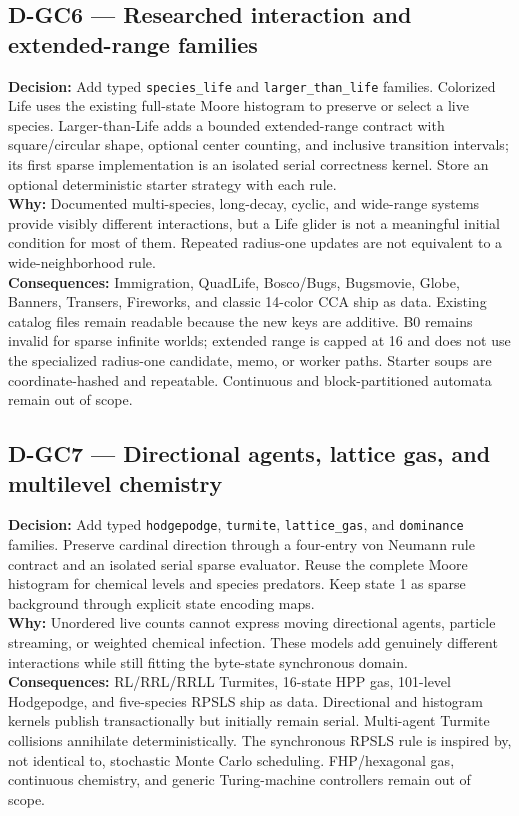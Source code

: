 \subsection*{D-GC6 --- Researched interaction and extended-range families}
\begin{decisionbox}[title={D-GC6 \quad 2026-09-15}]
\textbf{Decision:} Add typed \texttt{species\_life} and
\texttt{larger\_than\_life} families. Colorized Life uses the existing
full-state Moore histogram to preserve or select a live species.
Larger-than-Life adds a bounded extended-range contract with square/circular
shape, optional center counting, and inclusive transition intervals; its first
sparse implementation is an isolated serial correctness kernel. Store an
optional deterministic starter strategy with each rule.\\
\textbf{Why:} Documented multi-species, long-decay, cyclic, and wide-range
systems provide visibly different interactions, but a Life glider is not a
meaningful initial condition for most of them. Repeated radius-one updates are
not equivalent to a wide-neighborhood rule.\\
\textbf{Consequences:} Immigration, QuadLife, Bosco/Bugs, Bugsmovie, Globe,
Banners, Transers, Fireworks, and classic 14-color CCA ship as data. Existing
catalog files remain readable because the new keys are additive. B0 remains
invalid for sparse infinite worlds; extended range is capped at 16 and does not
use the specialized radius-one candidate, memo, or worker paths. Starter soups
are coordinate-hashed and repeatable. Continuous and block-partitioned
automata remain out of scope.
\end{decisionbox}

\subsection*{D-GC7 --- Directional agents, lattice gas, and multilevel chemistry}
\begin{decisionbox}[title={D-GC7 \quad 2026-09-15}]
\textbf{Decision:} Add typed \texttt{hodgepodge}, \texttt{turmite},
\texttt{lattice\_gas}, and \texttt{dominance} families. Preserve cardinal
direction through a four-entry von Neumann rule contract and an isolated serial
sparse evaluator. Reuse the complete Moore histogram for chemical levels and
species predators. Keep state 1 as sparse background through explicit state
encoding maps.\\
\textbf{Why:} Unordered live counts cannot express moving directional agents,
particle streaming, or weighted chemical infection. These models add genuinely
different interactions while still fitting the byte-state synchronous domain.\\
\textbf{Consequences:} RL/RRL/RRLL Turmites, 16-state HPP gas, 101-level
Hodgepodge, and five-species RPSLS ship as data. Directional and histogram
kernels publish transactionally but initially remain serial. Multi-agent
Turmite collisions annihilate deterministically. The synchronous RPSLS rule is
inspired by, not identical to, stochastic Monte Carlo scheduling. FHP/hexagonal
gas, continuous chemistry, and generic Turing-machine controllers remain out of
scope.
\end{decisionbox}


